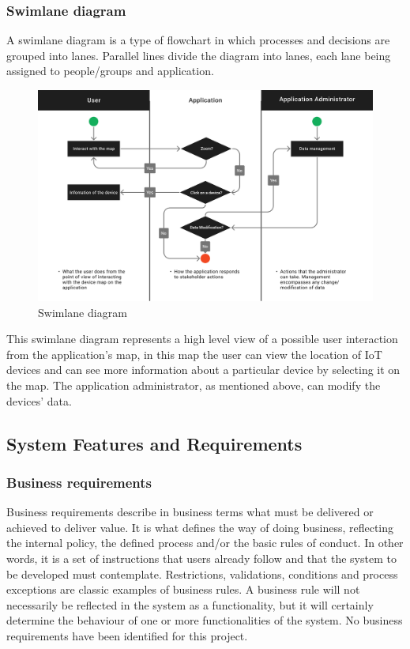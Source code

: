 \subsubsection*{Swimlane diagram}

A swimlane diagram is a type of flowchart in which processes and decisions
are grouped into lanes. Parallel lines divide the diagram into lanes, each
lane being assigned to people/groups and application.
\begin{figure}[H]
    \centering
    \includegraphics[width=15cm]{../app/docs/software_requirements/assets/images/swimlane_diagram.png}
    \caption{Swimlane diagram}
    \label{fig:diagram swimlane}
\end{figure}
This swimlane diagram represents a high level view of a possible user interaction
from the application's map, in this map the user can view the location of
IoT devices and can see more information about a particular device by selecting
it on the map. The application administrator, as mentioned above, can modify the
devices' data.

\subsection*{System Features and Requirements}

\subsubsection*{Business requirements}

Business requirements describe in business terms what must be delivered
or achieved to deliver value. It is what defines the way of doing business,
reflecting the internal policy, the defined process and/or the basic rules
of conduct.  In other words, it is a set of instructions that users already
follow and that the system to be developed must contemplate. Restrictions,
validations, conditions and process exceptions are classic examples of business
rules. A business rule will not necessarily be reflected in the system as
a functionality, but it will certainly determine the behaviour of one or
more functionalities of the system.
\newline
No business requirements have been identified for this project.

